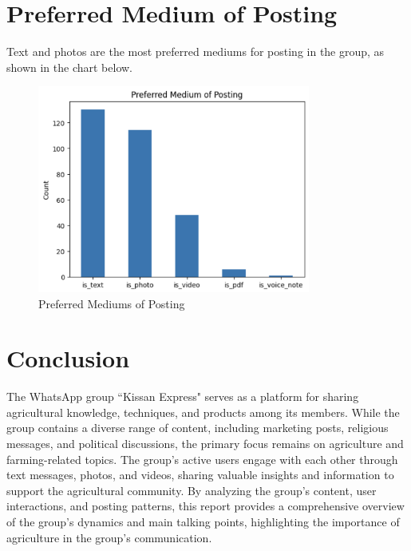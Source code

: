 \documentclass[12pt]{article}
\begin{document}
\section{Preferred Medium of Posting}
Text and photos are the most preferred mediums for posting in the group, as shown in the chart below.
\begin{figure}[H]
\centering
\includegraphics[width=0.8\textwidth]{img/medium_preference.png}
\caption{Preferred Mediums of Posting}
\end{figure}

\section{Conclusion}
The WhatsApp group ``Kissan Express" serves as a platform for sharing agricultural knowledge, techniques, and products among its members. While the group contains a diverse range of content, including marketing posts, religious messages, and political discussions, the primary focus remains on agriculture and farming-related topics. The group's active users engage with each other through text messages, photos, and videos, sharing valuable insights and information to support the agricultural community. By analyzing the group's content, user interactions, and posting patterns, this report provides a comprehensive overview of the group's dynamics and main talking points, highlighting the importance of agriculture in the group's communication.
\end{document}
